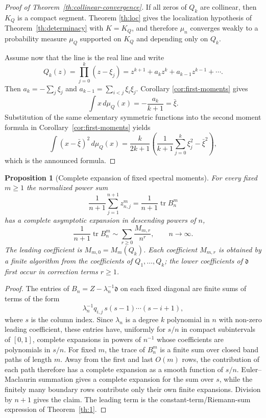 \documentclass[10pt,twoside,a4paper,reqno]{amsart}
\theoremstyle{plain}
\newtheorem{pro}            {Proposition}
\theoremstyle{definition}
\theoremstyle{remark}
\newenvironment{proposition}{\begin{pro}}{\end{pro}}
\newcommand {\dq}{\mathfrak d}
\begin{document}
\begin{proof}[Proof of Theorem~\ref{th:collinear-convergence}]
If all zeros of $Q_k$ are collinear, then $K_Q$ is a compact segment.  Theorem
\ref{th:loc} gives the localization hypothesis of Theorem~\ref{th:determinacy}
with $K=K_Q$, and therefore $\mu_n$ converges weakly to a probability measure
$\mu_Q$ supported on $K_Q$ and depending only on $Q_k$.

Assume now that the line is the real line and write
\[
        Q_k(z)=\prod_{j=0}^k(z-\xi_j)
        =z^{k+1}+a_kz^k+a_{k-1}z^{k-1}+\cdots .
\]
Then $a_k=-\sum_j\xi_j$ and $a_{k-1}=\sum_{i<j}\xi_i\xi_j$.  Corollary
\ref{cor:first-moments} gives
\[
        \int x\,d\mu_Q(x)=-\frac{a_k}{k+1}=\bar\xi.
\]
Substitution of the same elementary symmetric functions into the second moment
formula in Corollary~\ref{cor:first-moments} yields
\[
        \int (x-\bar\xi)^2\,d\mu_Q(x)
        =\frac{k}{2k+1}\left(\frac1{k+1}\sum_{j=0}^k\xi_j^2-\bar\xi^2\right),
\]
which is the announced formula.
\end{proof}

\begin{proposition}[Complete expansion of fixed spectral moments]
\label{prop:moment-expansion}
For every fixed $m\ge1$ the normalized power sum
\[
        \frac1{n+1}\sum_{j=1}^{n+1}z_{n,j}^m
        =\frac1{n+1}\operatorname{tr}B_n^m
\]
has a complete asymptotic expansion in descending powers of $n$,
\[
        \frac1{n+1}\operatorname{tr}B_n^m
        \sim \sum_{r\ge0}\frac{M_{m,r}}{n^r},\qquad n\to\infty .
\]
The leading coefficient is $M_{m,0}=M_m(Q_k)$.  Each coefficient $M_{m,r}$ is
obtained by a finite algorithm from the coefficients of $Q_1,\ldots,Q_k$; the
lower coefficients of $\dq$ first occur in correction terms $r\ge1$.
\end{proposition}

\begin{proof}
The entries of $B_n=Z-\lambda_n^{-1}\dq$ on each fixed diagonal are finite sums
of terms of the form
\[
        \lambda_n^{-1}q_{i,j}\,s(s-1)\cdots(s-i+1),
\]
where $s$ is the column index.  Since $\lambda_n$ is a degree $k$ polynomial in
$n$ with non-zero leading coefficient, these entries have, uniformly for
$s/n$ in compact subintervals of $[0,1]$, complete expansions in powers of
$n^{-1}$ whose coefficients are polynomials in $s/n$.  For fixed $m$, the trace
of $B_n^m$ is a finite sum over closed band paths of length $m$.  Away from the
first and last $O(m)$ rows, the contribution of each path therefore has a
complete expansion as a smooth function of $s/n$.  Euler--Maclaurin summation
gives a complete expansion for the sum over $s$, while the finitely many boundary
rows contribute only their own finite expansions.  Division by $n+1$ gives the
claim.  The leading term is the constant-term/Riemann-sum expression of
Theorem~\ref{th:1}.
\end{proof}
\end{document}
